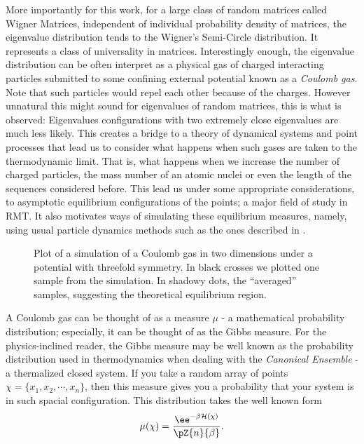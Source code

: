 More importantly for this work, for a large class of random matrices called Wigner Matrices, independent of individual probability density of matrices, the eigenvalue distribution tends to the Wigner's Semi-Circle distribution. It represents a class of universality in matrices. Interestingly enough, the eigenvalue distribution can be often interpret as a physical gas of charged interacting particles submitted to some confining external potential known as a \textit{Coulomb gas}. Note that such particles would repel each other because of the charges. However unnatural this might sound for eigenvalues of random matrices, this is what is observed: Eigenvalues configurations with two extremely close eigenvalues are much less likely. This creates a bridge to a theory of dynamical systems and point processes that lead us to consider what happens when such gases are taken to the thermodynamic limit. That is, what happens when we increase the number of charged particles, the mass number of an atomic nuclei or even the length of the sequences considered before. This lead us under some appropriate considerations, to asymptotic equilibrium configurations of the points; a major field of study in RMT. It also motivates ways of simulating these equilibrium measures, namely, using usual particle dynamics methods such as the ones described in .

\begin{figure}[h!]
	\centering
	\caption{Plot of a simulation of a Coulomb gas in two dimensions under a potential with threefold symmetry. In black crosses we plotted one sample from the simulation. In shadowy dots, the \enquote{averaged} samples, suggesting the theoretical equilibrium region.}
\end{figure}

A Coulomb gas can be thought of as a measure $\mu$ - a mathematical probability distribution; especially, it can be thought of as the Gibbs measure. For the physics-inclined reader, the Gibbs measure may be well known as the probability distribution used in thermodynamics when dealing with the \textit{Canonical Ensemble} - a thermalized closed system. If you take a random array of points $\chi = \{x_1, x_2, \cdots, x_n\}$, then this measure gives you a probability that your system is in such spacial configuration. This distribution takes the well known form
\begin{equation}
	\mu(\chi) = \frac{\ee^{-\beta \mathcal{H}(\chi)}}{\pZ{n}{\beta}}.
\end{equation}
 
